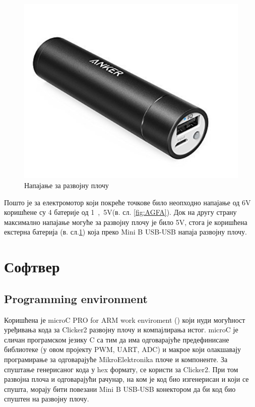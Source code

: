 	\begin{figure}[htb!]
		\begin{center}
			\includegraphics[scale=0.5]{pictures/ExternalBattery} 
			\caption{Напајање за развојну плочу}\label{fig:extBattery}
		\end{center}
	\end{figure}
	Пошто је за електромотор који покреће точкове било неопходно напајање од \si{6V} коришћене су 4 батерије од \si{1,5V}(в. сл. \ref{fig:AGFA}). Док на другу страну максимално напајање могуће за развојну плочу је било \si{5V}, стога је коришћена екстерна батерија (в. сл.\ref{fig:extBattery}) која преко Mini B USB-USB напаја развојну плочу. 
	\newpage
	
\section{Софтвер}
	\subsection{Programming environment}
Коришћена је microC PRO for ARM work enviroment (\cite{MICROCPRO}) који нуди могућност уређивања кода за Clicker2 развојну плочу и компајлирања истог. microC је сличан програмском језику C са тим да има одговарајуће предефинисане библиотеке (у овом пројекту PWM, UART, ADC) и макрое који олакшавају програмирање за одговарајуће MikroElektronika плоче и компоненте. За спуштање генерисаног кода у hex формату, се користи \cite{Bootloader} за Clicker2. При том развојна плоча и одговарајући рачунар, на ком је код био изгенерисан и који се спушта, морају бити повезани Mini B USB-USB конектором да би код био спуштен на развојну плочу.
